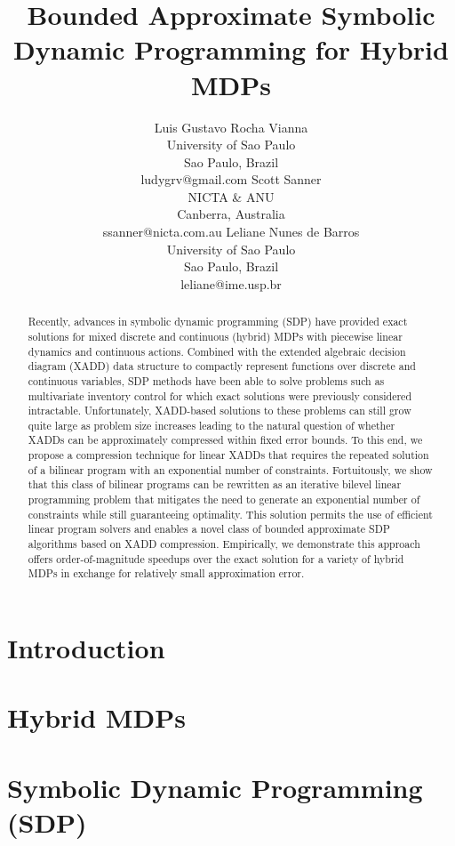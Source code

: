 \documentclass{article}
\title{	Bounded Approximate Symbolic Dynamic Programming for Hybrid MDPs }
\author{Luis Gustavo Rocha Vianna\\
University of Sao Paulo\\
Sao Paulo, Brazil\\
ludygrv@gmail.com
\And
Scott Sanner\\
NICTA \& ANU\\
Canberra, Australia\\
ssanner@nicta.com.au
\And
Leliane Nunes de Barros\\
University of Sao Paulo\\
Sao Paulo, Brazil\\
leliane@ime.usp.br}
\begin{document}
\maketitle

\begin{abstract}
Recently, advances in symbolic dynamic programming (SDP) have provided exact solutions for mixed discrete and continuous (hybrid) MDPs with piecewise linear dynamics and continuous actions. Combined with the extended algebraic decision diagram (XADD) data structure to compactly represent functions over discrete and continuous variables, SDP methods have been able to solve problems such as multivariate inventory control for which exact solutions were previously considered intractable. Unfortunately, XADD-based solutions to these problems can still grow quite large as problem size increases leading to the natural question of whether XADDs can be approximately compressed within fixed error bounds. To this end, we propose a compression technique for linear XADDs that requires the repeated solution of a bilinear program with an exponential number of constraints. Fortuitously, we show that this class of bilinear programs can be rewritten as an iterative bilevel linear programming problem that mitigates the need to generate an exponential number of constraints while still guaranteeing optimality. This solution permits the use of efficient linear program solvers and enables a novel class of bounded approximate SDP algorithms based on XADD compression. Empirically, we demonstrate this approach offers order-of-magnitude speedups over the exact solution for a variety of hybrid MDPs in exchange for relatively small approximation error.
\end{abstract}

\section{Introduction}



\section{Hybrid MDPs}



\section{Symbolic Dynamic Programming (SDP)}
\end{document}
